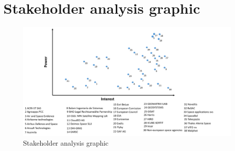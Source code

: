 \section{Stakeholder analysis graphic}
\begin{figure}[H]
\centering
\includegraphics[width=\textwidth]{././images/identitymatrix.png} 
\caption{Stakeholder analysis graphic}
\end{figure}
